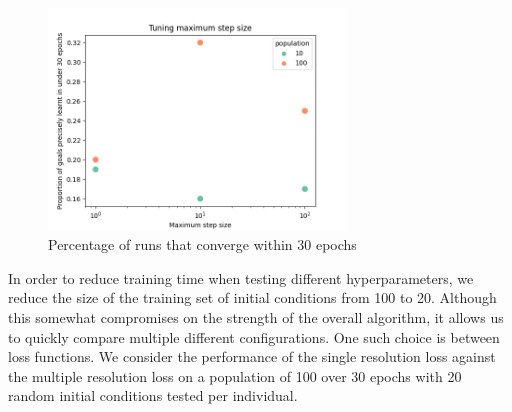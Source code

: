 \begin{figure}[!h]
\centering
\includegraphics[width=0.7\textwidth]{images/tune-max-step.png}
\caption{Percentage of runs that converge within 30 epochs}
\label{fig:tune-max-step}
\end{figure}

In order to reduce training time when testing different hyperparameters, we reduce the size of the training set of initial conditions from 100 to 20. Although this somewhat compromises on the strength of the overall algorithm, it allows us to quickly compare multiple different configurations. One such choice is between loss functions. We consider the performance of the single resolution loss against the multiple resolution loss on a population of 100 over 30 epochs with 20 random initial conditions tested per individual.\\    

